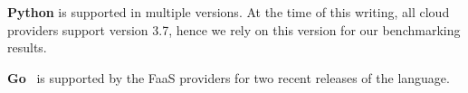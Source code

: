 
\textbf{Python} is supported in multiple versions. %
At the time of this writing, all cloud providers support version 3.7, hence we rely on this version for our benchmarking results.



\textbf{Go}~\cite{GoProject,GoProject} is supported by the FaaS providers for two recent releases of the language.

